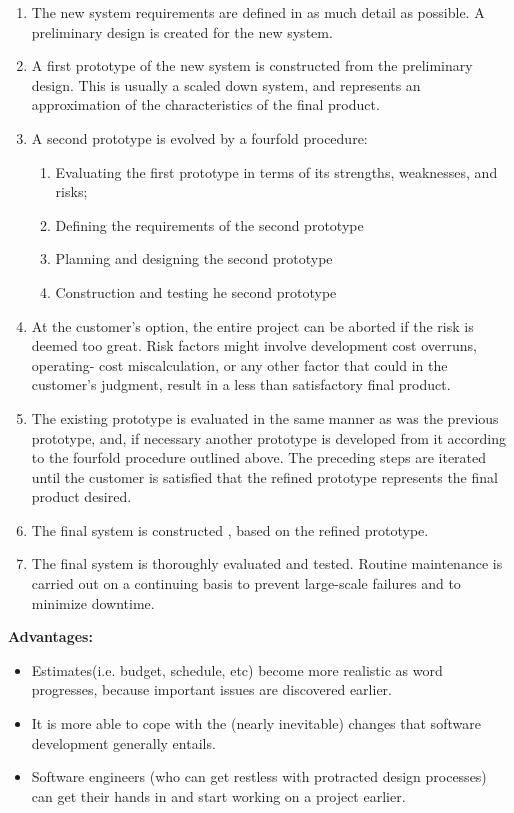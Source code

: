 \begin{enumerate}
 \item The new system requirements are defined in as much detail as possible. A preliminary design is created for the new system. 
 \item A first prototype of the new system is constructed from the preliminary design. This is usually a scaled down system, 
and represents an approximation of the characteristics of the final product. 
 \item A second prototype is evolved by a fourfold procedure:
 \begin{enumerate}
  \item Evaluating the first prototype in terms of its strengths, weaknesses, and risks;
  \item Defining the requirements of the second prototype
  \item Planning and designing the second prototype 
  \item Construction and testing he second prototype 
 \end{enumerate}
 \item At the customer's option, the entire project can be aborted if the risk is deemed too great. Risk factors might 
involve development cost overruns, operating- cost miscalculation, or any other factor that could in the customer's judgment, 
result in a less than satisfactory final product.
 \item The existing prototype is evaluated in the same manner as was the previous prototype, and, if necessary another prototype 
is developed from it according to the fourfold procedure outlined above. The preceding steps are iterated until the customer is 
satisfied that the refined prototype represents the final product desired.
 \item The final system is constructed , based on the refined prototype. 
 \item The final system is thoroughly evaluated and tested. Routine maintenance is carried out on a continuing basis to prevent 
large-scale failures and to minimize downtime.
\end{enumerate}
\textbf{Advantages:}
\begin{itemize}
 \item Estimates(i.e. budget, schedule, etc) become more realistic as word progresses, because important issues are discovered earlier. 
 \item It is more able to cope with the (nearly inevitable) changes that software development generally entails. 
 \item Software engineers (who can get restless with protracted design processes) can get their hands in and start working 
on a project earlier.
\end{itemize}
\newpage

